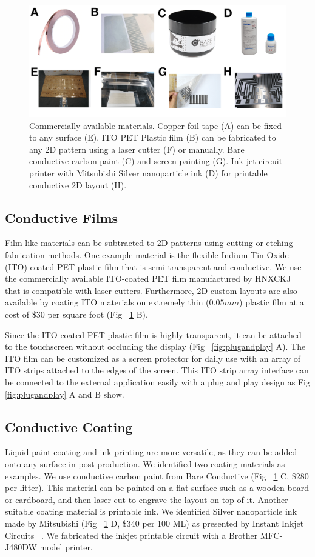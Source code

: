 \begin{figure}
\centering
  \includegraphics[width=0.7\columnwidth]{figures/material.png}
  \setlength{\belowcaptionskip}{-8pt}
  \caption{Commercially available materials. Copper foil tape (A) can be fixed to any surface (E). ITO PET Plastic film (B) can be fabricated to any 2D pattern using a laser cutter (F) or manually. Bare conductive carbon paint (C) and screen painting (G). Ink-jet circuit printer with Mitsubishi Silver nanoparticle ink (D) for printable conductive 2D layout (H). }
  \label{fig:material}
\end{figure}

\subsection{Conductive Films}
Film-like materials can be subtracted to 2D patterns using cutting or etching fabrication methods. One example material is the flexible Indium Tin Oxide (ITO) coated PET plastic film that is semi-transparent and conductive. We use the commercially available ITO-coated PET film manufactured by HNXCKJ ~\cite{ITO} that is compatible with laser cutters. Furthermore, 2D custom layouts are also available by coating ITO materials on extremely thin ($0.05 mm$) plastic film at a cost of \$30 per square foot (Fig ~\ref{fig:material} B).

Since the ITO-coated PET plastic film is highly transparent, it can be attached to the touchscreen without occluding the display (Fig ~\ref{fig:plugandplay} A). The ITO film can be customized as a screen protector for daily use with an array of ITO strips attached to the edges of the screen. This ITO strip array interface can be connected to the external application easily with a plug and play design as Fig \ref{fig:plugandplay} A and B show.

\subsection{Conductive Coating}
Liquid paint coating and ink printing are more versatile, as they can be added onto any surface in post-production. We identified two coating materials as examples. We use conductive carbon paint from Bare Conductive (Fig ~\ref{fig:material} C, \$280 per litter).  This material can be painted on a flat surface such as a wooden board or cardboard, and then laser cut to engrave the layout on top of it. Another suitable coating material is printable ink. We identified Silver nanoparticle ink made by Mitsubishi (Fig ~\ref{fig:material} D, \$340 per 100 ML) as presented by Instant Inkjet Circuits ~\cite{Kawahara-inkjet}. We fabricated the inkjet printable circuit with a Brother MFC-J480DW model printer. 

